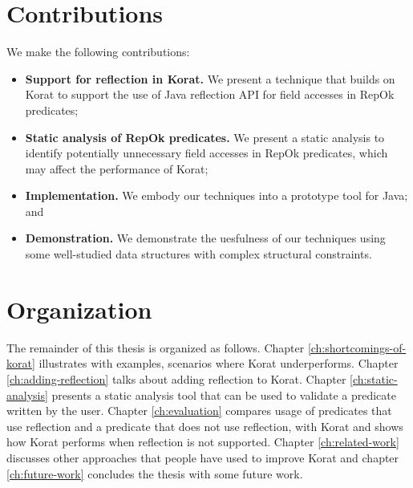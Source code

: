 \section{Contributions}
\label{sec:contributions}
\noindent We make the following contributions:

\begin{itemize}
\item {\bf Support for reflection in Korat.}  We present a technique
  that builds on Korat to support the use of Java reflection API for
  field accesses in RepOk predicates;
\item {\bf Static analysis of RepOk predicates.} We present a static
  analysis to identify potentially unnecessary field accesses in RepOk
  predicates, which may affect the performance of Korat;
\item {\bf Implementation.} We embody our techniques into a prototype
  tool for Java; and
\item {\bf Demonstration.} We demonstrate the uesfulness of our
  techniques using some well-studied data structures with complex
  structural constraints.
\end{itemize}

\section{Organization}
\label{sec:organization-of-thesis}
The remainder of this thesis is organized as follows. Chapter \ref{ch:shortcomings-of-korat} illustrates with examples, scenarios where Korat underperforms. Chapter \ref{ch:adding-reflection} talks about adding reflection to Korat. Chapter \ref{ch:static-analysis} presents a static analysis tool that can be used to validate a predicate written by the user. Chapter \ref{ch:evaluation} compares usage of predicates that use reflection and a predicate that does not use reflection, with Korat and shows how Korat performs when reflection is not supported. Chapter \ref{ch:related-work} discusses other approaches that people have used to improve Korat and chapter \ref{ch:future-work} concludes the thesis with some future work.

